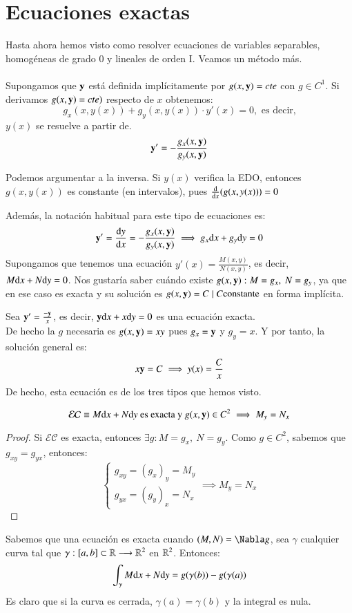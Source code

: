 \section{Ecuaciones exactas}
Hasta ahora hemos visto como resolver ecuaciones de variables separables, homogéneas de grado 0 y lineales de orden I. Veamos un método más.\\\\
Supongamos que $\mathbf{y}$ está definida implícitamente por $g(x, \mathbf{y}) = cte$ con $g \in C^1$. Si derivamos $g(x, \mathbf{y}) = cte)$ respecto de $x$ obtenemos:
$$
    g_x(x, y(x)) + g_y(x, y(x)) \cdot y'(x) = 0, \text{ es decir,}
$$
$y(x)$ se resuelve a partir de.
$$
    \mathbf{y'} = -\frac{g_x(x,\mathbf{y})}{g_y(x,\mathbf{y})}
$$
\begin{obs}
    Podemos argumentar a la inversa. Si $y(x)$ verifica la EDO, entonces $g(x, y(x))$ es constante (en intervalos), pues $\frac{\mathrm{d}}{\mathrm{d}x}(g(x, y(x))) = 0$
\end{obs}
Además, la notación habitual para este tipo de ecuaciones es:
$$
    \mathbf{y'} = \frac{\mathrm{d}y}{\mathrm{d}x} = -\frac{g_x(x,\mathbf{y})}{g_y(x,\mathbf{y})} \implies g_x\mathrm{d} x + g_y \mathrm{d} y = 0
$$
Supongamos que tenemos una ecuación $y'(x) = \frac{M(x,y)}{N(x,y)}$, es decir, $M\mathrm{d} x + N \mathrm{d} y = 0$. Nos gustaría saber cuándo existe $g(x, \mathbf{y}) : M = g_x,\ N = g_y$, ya que en ese caso es exacta y su solución es $g(x, \mathbf{y}) = C \mid C \text{constante}$ en forma implícita.
\begin{eg}
    Sea $\mathbf{y'} = \frac{-\mathbf{y}}{x}$, es decir, $\mathbf{y}\mathrm{d} x + x \mathrm{d} y = 0$ es una ecuación exacta.\\
    De hecho la $g$ necesaria es $g(x,\mathbf{y}) = xy$ pues $g_x = \mathbf{y}$ y $g_y = x$. Y por tanto, la solución general es:
    $$
        x\mathbf{y} = C \implies y(x) = \frac{C}{x}
    $$
    De hecho, esta ecuación es de los tres tipos que hemos visto.
\end{eg}
\begin{pro}
    $$
        \mathcal{EC} \equiv M\mathrm{d} x + N\mathrm{d} y \text{ es exacta y }g(x, \mathbf{y}) \in C^2 \implies M_y = N_x
    $$
\end{pro}
\begin{proof}
    Si $\mathcal{EC}$ es exacta, entonces $\exists g : M = g_x,\ N = g_y$. Como $g \in C^2$, sabemos que $g_{xy} = g_{yx}$, entonces:
    $$
        \begin{cases}
            g_{xy} = (g_x)_y = M_y\\
            g_{yx} = (g_y)_x = N_x
        \end{cases} \implies M_y = N_x
    $$
\end{proof}
\begin{obs}
    Sabemos que una ecuación es exacta cuando $(M, N) = \Nabla g$, sea $\gamma$ cualquier curva tal que $\gamma : [a,b]\subset\mathbb{R} \longrightarrow \mathbb{R}^2$ en $\mathbb{R}^2$. Entonces:
    $$
        \int_\gamma M\mathrm{d} x + N\mathrm{d} y = g(\gamma(b)) - g(\gamma(a))
    $$
    Es claro que si la curva es cerrada, $\gamma(a)=\gamma(b)$ y la integral es nula.
\end{obs}

